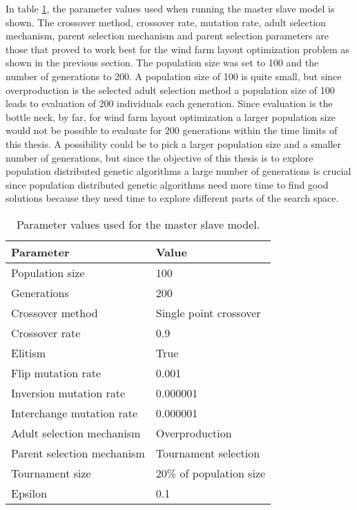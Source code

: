 \noindent In table \ref{table:final parameter settings master slave model}, the parameter values used when running the master slave model is shown. The crossover method, crossover rate, mutation rate, adult selection mechanism, parent selection mechanism and parent selection parameters are those that proved to work best for the wind farm layout optimization problem as shown in the previous section. The population size was set to 100 and the number of generations to 200. A population size of 100 is quite small, but since overproduction is the selected adult selection method a population size of 100 leads to evaluation of 200 individuals each generation. Since evaluation is the bottle neck, by far, for wind farm layout optimization a larger population size would not be possible to evaluate for 200 generations within the time limits of this thesis. A possibility could be to pick a larger population size and a smaller number of generations, but since the objective of this thesis is to explore population distributed genetic algorithms a large number of generations is crucial since population distributed genetic algorithms need more time to find good solutions because they need time to explore different parts of the search space. \\


\begin{table}[h!]
\centering
\caption{Parameter values used for the master slave model.}
\label{table:final parameter settings master slave model}
\begin{tabular}{l|l}
\textbf{Parameter} & \textbf{Value} \\ 
\hline 
Population size & 100 \\  
Generations & 200 \\ 
Crossover method & Single point crossover \\ 
Crossover rate & 0.9 \\ 
Elitism & True \\ 
Flip mutation rate & 0.001 \\ 
Inversion mutation rate & 0.000001 \\ 
Interchange mutation rate & 0.000001 \\ 
Adult selection mechanism & Overproduction \\ 
Parent selection mechanism & Tournament selection \\ 
Tournament size & 20\% of population size\\ 
Epsilon & 0.1 \\ 
\end{tabular} 
\end{table}


